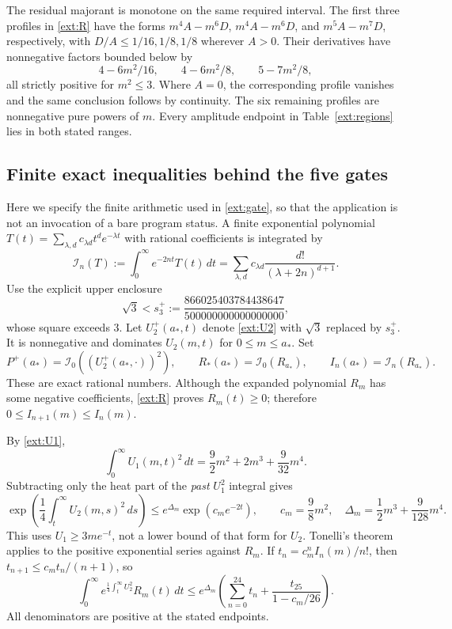 The residual majorant is monotone on the same required interval.
The first three profiles in \eqref{ext:R} have the forms
$m^4A-m^6D$, $m^4A-m^6D$, and $m^5A-m^7D$, respectively, with
$D/A\le1/16,1/8,1/8$ wherever $A>0$. Their derivatives have nonnegative
factors bounded below by
\[
 4-6m^2/16,\qquad4-6m^2/8,\qquad5-7m^2/8,
\]
all strictly positive for $m^2\le3$. Where $A=0$, the corresponding
profile vanishes and the same conclusion follows by continuity. The six
remaining profiles are nonnegative pure powers of $m$. Every amplitude
endpoint in Table~\ref{ext:regions} lies in both stated ranges.

\subsection{Finite exact inequalities behind the five gates}
\label{ext:arithmetic}

Here we specify the finite arithmetic used in \eqref{ext:gate}, so that
the application is not an invocation of a bare program status. A finite
exponential polynomial $T(t)=\sum_{\lambda,d}c_{\lambda d}t^de^{-\lambda t}$
with rational coefficients is integrated by
\begin{equation}
 \mathcal I_n(T):=\int_0^\infty e^{-2nt}T(t)\,dt
 =\sum_{\lambda,d}c_{\lambda d}
             \frac{d!}{(\lambda+2n)^{d+1}}.
 \label{ext:moments}
\end{equation}
Use the explicit upper enclosure
\[
 \sqrt3<s_3^+:=\frac{866025403784438647}{500000000000000000},
\]
whose square exceeds $3$. Let $U_2^+(a_*,t)$ denote \eqref{ext:U2} with
$\sqrt3$ replaced by $s_3^+$. It is nonnegative and dominates $U_2(m,t)$
for $0\le m\le a_*$. Set
\begin{equation}
 P^+(a_*)=\mathcal I_0((U_2^+(a_*,\cdot))^2),\qquad
 R_*(a_*)=\mathcal I_0(R_{a_*}),\qquad
 I_n(a_*)=\mathcal I_n(R_{a_*}).
 \label{ext:certinputs}
\end{equation}
These are exact rational numbers. Although the expanded polynomial $R_m$
has some negative coefficients, \eqref{ext:R} proves $R_m(t)\ge0$;
therefore $0\le I_{n+1}(m)\le I_n(m)$.

By \eqref{ext:U1},
\[
 \int_0^\infty U_1(m,t)^2\,dt
 =\frac92m^2+2m^3+\frac9{32}m^4.
\]
Subtracting only the heat part of the \emph{past} $U_1^2$ integral gives
\begin{equation}
 \exp\!\left(\frac14\int_t^\infty U_2(m,s)^2\,ds\right)
 \le e^{\Delta_m}\exp(c_me^{-2t}),\qquad
 c_m=\frac98m^2,\quad \Delta_m=\frac12m^3+\frac9{128}m^4.
 \label{ext:weight}
\end{equation}
This uses $U_1\ge3me^{-t}$, not a lower bound of that form for $U_2$.
Tonelli's theorem applies to the positive exponential series against $R_m$.
If $t_n=c_m^nI_n(m)/n!$, then
$t_{n+1}\le c_mt_n/(n+1)$, so
\begin{equation}
 \int_0^\infty e^{\frac14\int_t^\infty U_2^2}R_m(t)\,dt
 \le e^{\Delta_m}
 \left(\sum_{n=0}^{24}t_n+\frac{t_{25}}{1-c_m/26}\right).
 \label{ext:tail}
\end{equation}
All denominators are positive at the stated endpoints.

